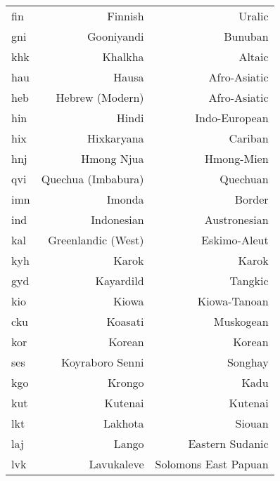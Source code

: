 {\begin{longtable}{lrr}
fin                & Finnish                   & Uralic               \\
gni                & Gooniyandi                & Bunuban              \\
khk                & Khalkha                   & Altaic               \\
hau                & Hausa                     & Afro-Asiatic         \\
heb                & Hebrew (Modern)           & Afro-Asiatic         \\
hin                & Hindi                     & Indo-European        \\
hix                & Hixkaryana                & Cariban              \\
hnj                & Hmong Njua                & Hmong-Mien           \\
qvi                & Quechua (Imbabura)        & Quechuan             \\
imn                & Imonda                    & Border               \\
ind                & Indonesian                & Austronesian         \\
kal                & Greenlandic (West)        & Eskimo-Aleut         \\
kyh                & Karok                     & Karok                \\
gyd                & Kayardild                 & Tangkic              \\
kio                & Kiowa                     & Kiowa-Tanoan         \\
cku                & Koasati                   & Muskogean            \\
kor                & Korean                    & Korean               \\
ses                & Koyraboro Senni           & Songhay              \\
kgo                & Krongo                    & Kadu                 \\
kut                & Kutenai                   & Kutenai              \\
\pagebreak
lkt                & Lakhota                   & Siouan               \\
laj                & Lango                     & Eastern Sudanic      \\
lvk                & Lavukaleve                & Solomons East Papuan \\

\end{longtable}}
